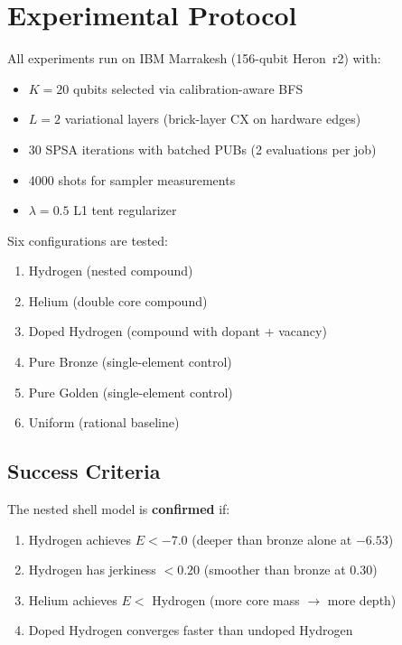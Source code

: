 \documentclass[twocolumn,showpacs,preprintnumbers,amsmath,amssymb,aps,prl]{revtex4-2}
\begin{document}
\section{Experimental Protocol}
\label{sec:experiment}

All experiments run on IBM Marrakesh (156-qubit Heron~r2) with:
\begin{itemize}
    \item $K = 20$ qubits selected via calibration-aware BFS
    \item $L = 2$ variational layers (brick-layer CX on hardware edges)
    \item 30 SPSA iterations with batched PUBs (2 evaluations per job)
    \item 4000 shots for sampler measurements
    \item $\lambda = 0.5$ L1 tent regularizer
\end{itemize}

Six configurations are tested:
\begin{enumerate}
    \item[A.] Hydrogen (nested compound)
    \item[B.] Helium (double core compound)
    \item[C.] Doped Hydrogen (compound with dopant + vacancy)
    \item[D.] Pure Bronze (single-element control)
    \item[E.] Pure Golden (single-element control)
    \item[F.] Uniform (rational baseline)
\end{enumerate}

\subsection{Success Criteria}

The nested shell model is \textbf{confirmed} if:
\begin{enumerate}
    \item Hydrogen achieves $E < -7.0$ (deeper than bronze alone at $-6.53$)
    \item Hydrogen has jerkiness $< 0.20$ (smoother than bronze at $0.30$)
    \item Helium achieves $E <$ Hydrogen (more core mass $\to$ more depth)
    \item Doped Hydrogen converges faster than undoped Hydrogen
\end{enumerate}
\end{document}
